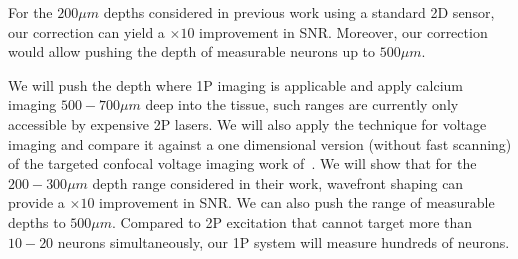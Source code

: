 	
For the $200\mu m$ depths considered in previous work using a standard 2D sensor, our correction can yield a $\times 10$ improvement in SNR. Moreover, our correction would allow pushing the depth of measurable neurons up to $500\mu m$.
	
	
	 We will push the depth where 1P imaging is applicable and apply calcium imaging  $500-700\mu m$ deep into the tissue, such ranges  are currently only accessible by expensive 2P lasers. 
	We will also apply the technique for voltage imaging and compare it against a one dimensional version (without fast scanning) of the targeted confocal voltage imaging work of~\cite{Xiao2024LargeScale}. We will show that for the $200-300\mu m$ depth range considered in their work, wavefront shaping can provide a $\times 10$ improvement in SNR.  We can also push the range of measurable depths to $500\mu m$. Compared to 2P excitation that cannot target more than $10-20$ neurons simultaneously, our 1P system will measure hundreds of neurons. 
